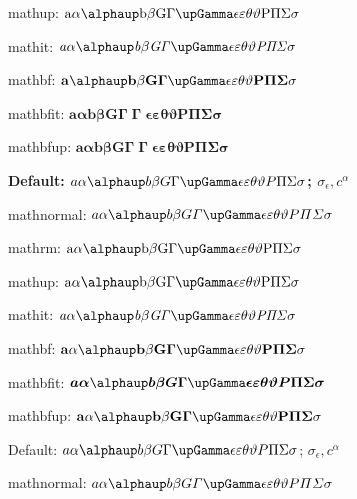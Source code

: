 \documentclass[12pt, a4paper, oneside]{article}
\newcommand{\mathup}[1]{\mathrm{#1}}
\newcommand{\mathbfit}[1]{\bm{#1}}
\newcommand{\mathbfup}[1]{\mathbf{#1}}
\theoremstyle{Plain}
\theoremstyle{Definition}
\theoremstyle{Remark}
\begin{document}
\begin{appendix}
{mathup: $\mathup{a \alpha \alphaup b \beta G \Gamma \upGamma \epsilon \varepsilon \theta \vartheta P \Pi \Sigma \sigma}$

mathit: $\mathit{a \alpha \alphaup b \beta G \Gamma \upGamma \epsilon \varepsilon \theta \vartheta P \Pi \Sigma \sigma}$

mathbf: $\mathbf{a \alphaup b \beta G \Gamma \upGamma \epsilon \varepsilon \theta \vartheta P \Pi \Sigma \sigma}$

mathbfit: $\mathbfit{a \alpha b \beta G \Gamma \upGamma \epsilon \varepsilon \theta \vartheta P \Pi \Sigma \sigma}$

mathbfup: $\mathbfup{a \alpha b \beta G \Gamma \upGamma \epsilon \varepsilon \theta \vartheta P \Pi \Sigma \sigma}$

\bigskip

{\bfseries
Default: $a \alpha \alphaup b \beta G \Gamma \upGamma \epsilon \varepsilon \theta \vartheta P \Pi \Sigma \sigma$; $\sigma_\epsilon, c^\alpha$

mathnormal: $\mathnormal{a \alpha \alphaup b \beta G \Gamma \upGamma \epsilon \varepsilon \theta \vartheta P \Pi \Sigma \sigma}$

mathrm: $\mathrm{a \alpha \alphaup b \beta G \Gamma \upGamma \epsilon \varepsilon \theta \vartheta P \Pi \Sigma \sigma}$

mathup: $\mathup{a \alpha \alphaup b \beta G \Gamma \upGamma \epsilon \varepsilon \theta \vartheta P \Pi \Sigma \sigma}$

mathit: $\mathit{a \alpha \alphaup b \beta G \Gamma \upGamma \epsilon \varepsilon \theta \vartheta P \Pi \Sigma \sigma}$

mathbf: $\mathbf{a \alpha \alphaup b \beta G \Gamma \upGamma \epsilon \varepsilon \theta \vartheta P \Pi \Sigma \sigma}$

mathbfit: $\mathbfit{a \alpha \alphaup b \beta G \Gamma \upGamma \epsilon \varepsilon \theta \vartheta P \Pi \Sigma \sigma}$

mathbfup: $\mathbfup{a \alpha \alphaup b \beta G \Gamma \upGamma \epsilon \varepsilon \theta \vartheta P \Pi \Sigma \sigma}$
}

\bigskip

{\sffamily\mdseries
Default: $a \alpha \alphaup b \beta G \Gamma \upGamma \epsilon \varepsilon \theta \vartheta P \Pi \Sigma \sigma$; $\sigma_\epsilon, c^\alpha$

mathnormal: $\mathnormal{a \alpha \alphaup b \beta G \Gamma \upGamma \epsilon \varepsilon \theta \vartheta P \Pi \Sigma \sigma}$

}}
\end{appendix}
\end{document}
